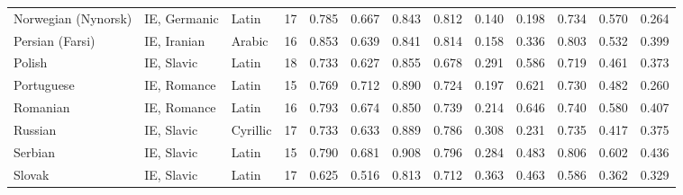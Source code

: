 \begin{tabular}{lllrrrrrrrrrr}
            Norwegian (Nynorsk) &                    IE, Germanic &                 Latin &        17 &                       0.785 &                         0.667 &         0.843 &                  0.812 &            0.140 &                         0.198 &         0.734 &                  0.570 &            0.264 \\
                Persian (Farsi) &                     IE, Iranian &                Arabic &        16 &                       0.853 &                         0.639 &         0.841 &                  0.814 &            0.158 &                         0.336 &         0.803 &                  0.532 &            0.399 \\
                         Polish &                      IE, Slavic &                 Latin &        18 &                       0.733 &                         0.627 &         0.855 &                  0.678 &            0.291 &                         0.586 &         0.719 &                  0.461 &            0.373 \\
                     Portuguese &                     IE, Romance &                 Latin &        15 &                       0.769 &                         0.712 &         0.890 &                  0.724 &            0.197 &                         0.621 &         0.730 &                  0.482 &            0.260 \\
                       Romanian &                     IE, Romance &                 Latin &        16 &                       0.793 &                         0.674 &         0.850 &                  0.739 &            0.214 &                         0.646 &         0.740 &                  0.580 &            0.407 \\
                        Russian &                      IE, Slavic &              Cyrillic &        17 &                       0.733 &                         0.633 &         0.889 &                  0.786 &            0.308 &                         0.231 &         0.735 &                  0.417 &            0.375 \\
                        Serbian &                      IE, Slavic &                 Latin &        15 &                       0.790 &                         0.681 &         0.908 &                  0.796 &            0.284 &                         0.483 &         0.806 &                  0.602 &            0.436 \\
                         Slovak &                      IE, Slavic &                 Latin &        17 &                       0.625 &                         0.516 &         0.813 &                  0.712 &            0.363 &                         0.463 &         0.586 &                  0.362 &            0.329 \\

\end{tabular}
